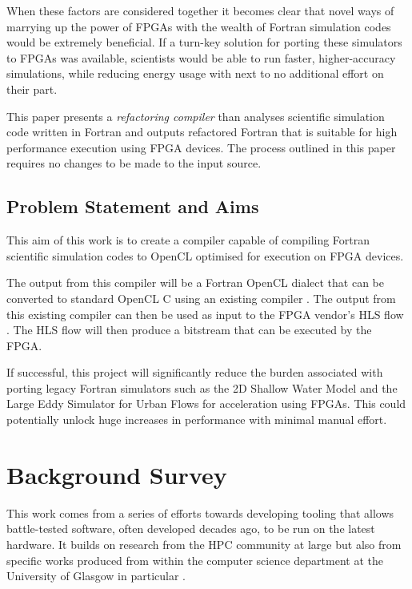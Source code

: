 \documentclass{mpaper}
\begin{document}
When these factors are considered together it becomes clear that novel ways of marrying up the power of FPGAs with the wealth of Fortran simulation codes would be extremely beneficial.
If a turn-key solution for porting these simulators to FPGAs was available, scientists would be able to run faster, higher-accuracy simulations, while reducing energy usage with next to no additional effort on their part.

This paper presents a \textit{refactoring compiler} than analyses scientific simulation code written in Fortran and outputs refactored Fortran that is suitable for high performance execution using FPGA devices. The process outlined in this paper requires no changes to be made to the input source.

\subsection{Problem Statement and Aims}

This aim of this work is to create a compiler capable of compiling Fortran scientific simulation codes to OpenCL optimised for execution on FPGA devices.

The output from this compiler will be a Fortran OpenCL dialect that can be converted to standard OpenCL C using an existing compiler \cite{VanderbauwhedeDavidson2018}.
The output from this existing compiler can then be used as input to the FPGA vendor's HLS flow \cite{IntelCorporation, Xilinx}.
The HLS flow will then produce a bitstream that can be executed by the FPGA.

If successful, this project will significantly reduce the burden associated with porting legacy Fortran simulators such as the 2D Shallow Water Model \cite{Hall2009} and the Large Eddy Simulator for Urban Flows \cite{Nakayama2011} for acceleration using FPGAs.
This could potentially unlock huge increases in performance with minimal manual effort.

\section{Background Survey}

This work comes from a series of efforts towards developing tooling that allows battle-tested software, often developed decades ago, to be run on the latest hardware.
It builds on research from the HPC community at large \cite{Vanderbauwhede2014, Dimond2011, Corrigan2012, Oancea2012, Prasanna2006, Holewinski2012} but also from specific works produced from within the computer science department at the University of Glasgow in particular \cite{Vanderbauwhede2012, Nabi2015, Davidson2016, VanderbauwhedeNabi2018, VanderbauwhedeDavidson2018}.
\end{document}
